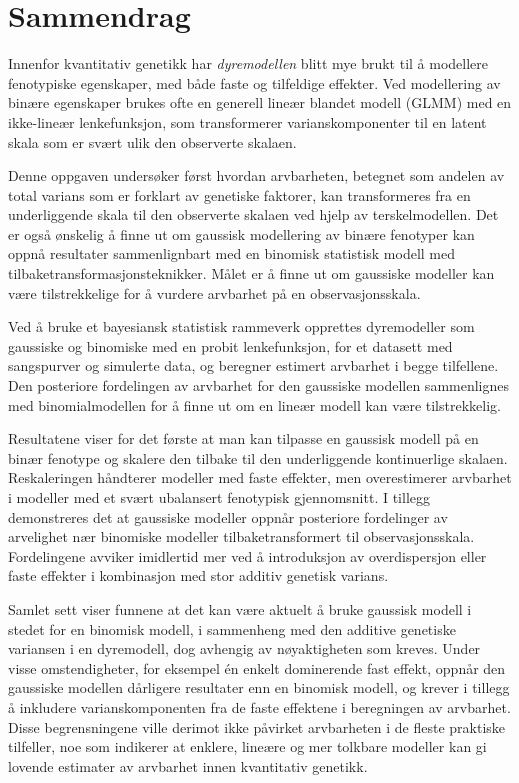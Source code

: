 \chapter*{Sammendrag}

Innenfor kvantitativ genetikk har \textit{dyremodellen} blitt mye brukt til å modellere fenotypiske egenskaper, med både faste og tilfeldige effekter. Ved modellering av binære egenskaper brukes ofte en generell lineær blandet modell (GLMM) med en ikke-lineær lenkefunksjon, som transformerer varianskomponenter til en latent skala som er svært ulik den observerte skalaen.

Denne oppgaven undersøker først hvordan arvbarheten, betegnet som andelen av total varians som er forklart av genetiske faktorer, kan transformeres fra en underliggende skala til den observerte skalaen ved hjelp av terskelmodellen. Det er også ønskelig å finne ut om gaussisk modellering av binære fenotyper kan oppnå resultater sammenlignbart med en binomisk statistisk modell med tilbaketransformasjonsteknikker. Målet er å finne ut om gaussiske modeller kan være tilstrekkelige for å vurdere arvbarhet på en observasjonsskala.

Ved å bruke et bayesiansk statistisk rammeverk opprettes dyremodeller som gaussiske og binomiske med en probit lenkefunksjon, for et datasett med sangspurver og simulerte data, og beregner estimert arvbarhet i begge tilfellene. Den posteriore fordelingen av arvbarhet for den gaussiske modellen sammenlignes med binomialmodellen for å finne ut om en lineær modell kan være tilstrekkelig.

Resultatene viser for det første at man kan tilpasse en gaussisk modell på en binær fenotype og skalere den tilbake til den underliggende kontinuerlige skalaen. Reskaleringen håndterer modeller med faste effekter, men overestimerer arvbarhet i modeller med et svært ubalansert fenotypisk gjennomsnitt. I tillegg demonstreres det at gaussiske modeller oppnår posteriore fordelinger av arvelighet nær binomiske modeller tilbaketransformert til observasjonsskala. Fordelingene avviker imidlertid mer ved å introduksjon av overdispersjon eller faste effekter i kombinasjon med stor additiv genetisk varians.

Samlet sett viser funnene at det kan være aktuelt å bruke gaussisk modell i stedet for en binomisk modell, i sammenheng med den additive genetiske variansen i en dyremodell, dog avhengig av nøyaktigheten som kreves. Under visse omstendigheter, for eksempel én enkelt dominerende fast effekt, oppnår den gaussiske modellen dårligere resultater enn en binomisk modell, og krever i tillegg å inkludere varianskomponenten fra de faste effektene i beregningen av arvbarhet. Disse begrensningene ville derimot ikke påvirket arvbarheten i de fleste praktiske tilfeller, noe som indikerer at enklere, lineære og mer tolkbare modeller kan gi lovende estimater av arvbarhet innen kvantitativ genetikk.